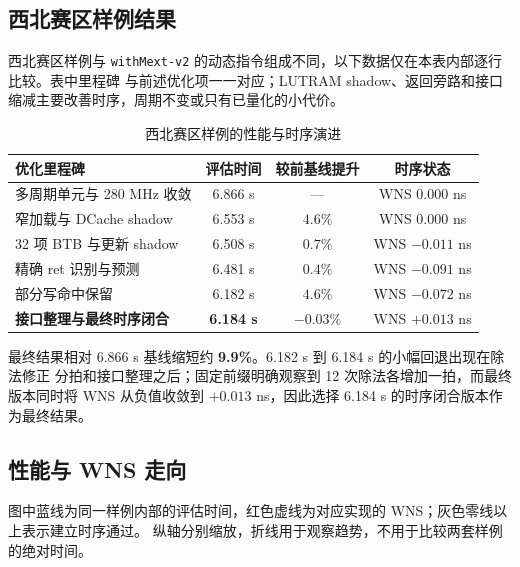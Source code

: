 \documentclass[UTF8,a4paper,12pt]{ctexart}
\newcommand{\code}[1]{\texttt{#1}}
\newcommand{\result}[1]{\textcolor{red!75!black}{\textbf{#1}}}
\begin{document}
\subsection{西北赛区样例结果}

西北赛区样例与 \code{withMext-v2} 的动态指令组成不同，以下数据仅在本表内部逐行比较。表中里程碑
与前述优化项一一对应；LUTRAM shadow、返回旁路和接口缩减主要改善时序，周期不变或只有已量化的小代价。

\begin{table}[H]
  \centering
  \caption{西北赛区样例的性能与时序演进}
  \setlength{\tabcolsep}{5pt}
  \begin{tabular}{@{}lccc@{}}
    \toprule
    优化里程碑 & 评估时间 & 较前基线提升 & 时序状态 \\
    \midrule
    多周期单元与 280 MHz 收敛 & 6.866 s & --- & WNS $0.000$ ns \\
    窄加载与 DCache shadow & 6.553 s & $4.6\%$ & WNS $0.000$ ns \\
    32 项 BTB 与更新 shadow & 6.508 s & $0.7\%$ & WNS $-0.011$ ns \\
    精确 ret 识别与预测 & 6.481 s & $0.4\%$ & WNS $-0.091$ ns \\
    部分写命中保留 & 6.182 s & $4.6\%$ & WNS $-0.072$ ns \\
    \textbf{接口整理与最终时序闭合} & \result{6.184 s} & $-0.03\%$ & WNS $+0.013$ ns \\
    \bottomrule
  \end{tabular}
\end{table}

最终结果相对 6.866 s 基线缩短约 \result{9.9\%}。6.182 s 到 6.184 s 的小幅回退出现在除法修正
分拍和接口整理之后；固定前缀明确观察到 12 次除法各增加一拍，而最终版本同时将 WNS 从负值收敛到
$+0.013$ ns，因此选择 6.184 s 的时序闭合版本作为最终结果。

\subsection{性能与 WNS 走向}

图中蓝线为同一样例内部的评估时间，红色虚线为对应实现的 WNS；灰色零线以上表示建立时序通过。
纵轴分别缩放，折线用于观察趋势，不用于比较两套样例的绝对时间。
\end{document}
